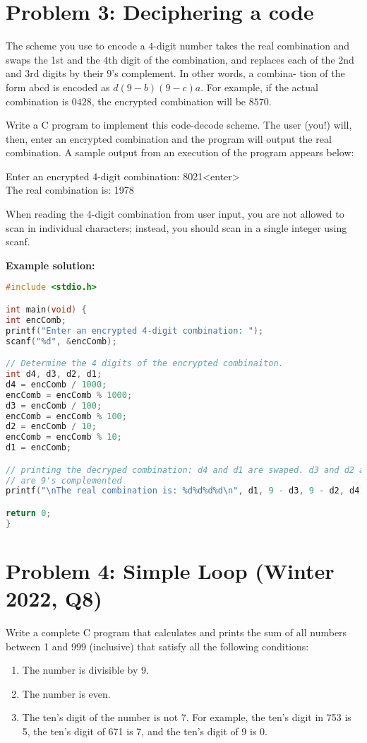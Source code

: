 \documentclass[12pt]{article}
\begin{document}
\section*{Problem 3: Deciphering  a code}

The scheme you use to encode a $4$-digit number takes the real combination and swaps the 1st and the $4$th digit of the combination, and replaces each of the $2$nd and $3$rd digits by their $9$’s complement. In other words, a combina- tion of the form abcd is encoded as $d(9-b)(9-c)a$. For example, if the actual combination is $0428$, the encrypted combination will be $8570$.

Write a C program to implement this code-decode scheme. The user (you!) will, then, enter an encrypted combination and the program will output the real combination. A sample output from an execution of the program appears below:
\begin{tcolorbox}[colback=gray!10, boxrule=0pt, sharp corners, enhanced jigsaw, left=3mm, right=3mm, top=1mm, bottom=1mm]
 Enter an encrypted 4-digit combination: 8021<enter> \\
 The real combination is: 1978
\end{tcolorbox}
When reading the 4-digit combination from user input, you are not allowed to scan in individual characters; instead, you should scan in a single integer using scanf.

\textbf{Example solution:}
\begin{lstlisting}[language=C]
#include <stdio.h>

int main(void) {
int encComb;
printf("Enter an encrypted 4-digit combination: ");
scanf("%d", &encComb);

// Determine the 4 digits of the encrypted combinaiton.
int d4, d3, d2, d1;
d4 = encComb / 1000;
encComb = encComb % 1000;
d3 = encComb / 100;
encComb = encComb % 100;
d2 = encComb / 10;
encComb = encComb % 10;
d1 = encComb;

// printing the decryped combination: d4 and d1 are swaped. d3 and d2 are
// are 9's complemented
printf("\nThe real combination is: %d%d%d%d\n", d1, 9 - d3, 9 - d2, d4);

return 0;
}
\end{lstlisting}

\section*{Problem 4: Simple Loop (Winter 2022, Q8)}

Write a complete C program that calculates and prints the sum of all numbers between 1 and 999 (inclusive) that satisfy all the following conditions:
\begin{enumerate}
	\item The number is divisible by 9.
	\item The number is even.
	\item The ten’s digit of the number is not 7. For example, the ten’s digit in 753 is 5, the ten’s digit of 671 is 7, and the ten’s digit of 9 is 0.
\end{enumerate}
\end{document}
